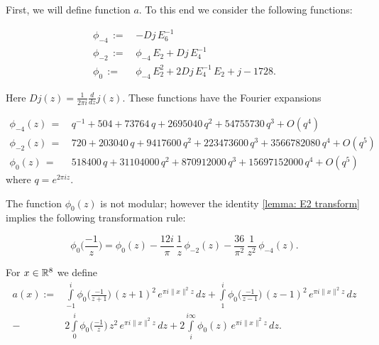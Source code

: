 First, we will define function $a$. To this end we consider the following functions:
\begin{definition}\label{def: phi4 phi2 phi0}
\begin{align}
  \phi_{-4}\,:= \,& -Dj\,E_6^{-1}\label{eqn: def phi4}\\
  \phi_{-2}\,:= \,&\phi_{-4}\,E_2+Dj\,E_4^{-1}\label{eqn: def phi2}\\
  \phi_{0}\,:= \,&\phi_{-4}\,E_2^2+2Dj\,E_4^{-1}\,E_2+j-1728.\label{eqn: def phi0}
\end{align}
\end{definition}
Here $Dj(z)=\frac{1}{2\pi i} \frac{d}{dz} j(z)$.
These functions have the Fourier expansions
\begin{lemma}\label{lemma: phi fourier4 phi fourier2 phi fourier0}
\begin{align}
  \phi_{-4}(z)\,=\,&q^{-1} + 504 + 73764\, q + 2695040\, q^2 + 54755730\, q^3 + O(q^4)\label{eqn: phi fourier4}\\
  \phi_{-2}(z)\,=\,&720 + 203040\, q + 9417600\, q^2 + 223473600\, q^3 + 3566782080\, q^4+O(q^5)\label{eqn: phi fourier2}\\
  \phi_{0}(z)\,=\,&518400\, q + 31104000\, q^2 + 870912000\, q^3 + 15697152000\, q^4+O(q^5)\label{eqn: phi fourier0}
\end{align}
where $q=e^{2\pi i z}$.
\end{lemma}
The function $\phi_0(z)$ is not modular; however the identity \ref{lemma: E2 transform} implies the following transformation rule:
\begin{lemma}\label{lemma: phi0 transform}
\begin{equation}\label{eqn: phi0 transform}
\phi_0\Big(\frac{-1}{z}\Big)=\phi_0(z)-\frac{12i}{\pi}\,\frac{1}{z}\,\phi_{-2}(z)-\frac{36}{\pi^2}\,\frac{1}{z^2}\,\phi_{-4}(z).
\end{equation}
\end{lemma}
\begin{definition}\label{def: a(r) definition}
For $x\in\mathbb{R}^8$ we define
\begin{align}\label{eqn: a(r) definition}
  a(x):=&\int\limits_{-1}^i\phi_0\Big(\frac{-1}{z+1}\Big)\,(z+1)^2\,e^{\pi i \|x\|^2 z}\,dz
  +\int\limits_{1}^i\phi_0\Big(\frac{-1}{z-1}\Big)\,(z-1)^2\,e^{\pi i \|x\|^2 z}\,dz\\
  -&2\int\limits_{0}^i\phi_0\Big(\frac{-1}{z}\Big)\,z^2\,e^{\pi i \|x\|^2 z}\,dz
  +2\int\limits_{i}^{i\infty}\phi_0(z)\,e^{\pi i \|x\|^2 z}\,dz.\nonumber
\end{align}
\end{definition}
